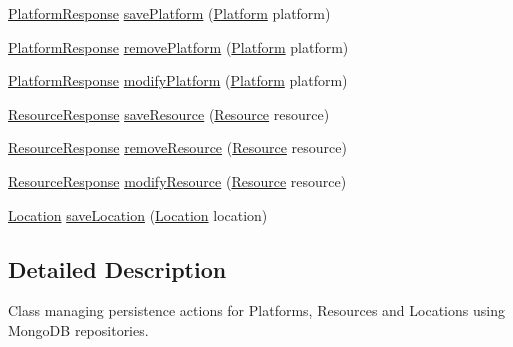 \begin{DoxyCompactItemize}
\item 
\hyperlink{classeu_1_1h2020_1_1symbiote_1_1model_1_1PlatformResponse}{Platform\+Response} \hyperlink{classeu_1_1h2020_1_1symbiote_1_1repository_1_1RepositoryManager_a4b0ab3911577e2b2577390e9c0566564}{save\+Platform} (\hyperlink{classeu_1_1h2020_1_1symbiote_1_1model_1_1Platform}{Platform} platform)
\item 
\hyperlink{classeu_1_1h2020_1_1symbiote_1_1model_1_1PlatformResponse}{Platform\+Response} \hyperlink{classeu_1_1h2020_1_1symbiote_1_1repository_1_1RepositoryManager_a3040700dcc9c91da9770fc2c5a96cdd1}{remove\+Platform} (\hyperlink{classeu_1_1h2020_1_1symbiote_1_1model_1_1Platform}{Platform} platform)
\item 
\hyperlink{classeu_1_1h2020_1_1symbiote_1_1model_1_1PlatformResponse}{Platform\+Response} \hyperlink{classeu_1_1h2020_1_1symbiote_1_1repository_1_1RepositoryManager_aeb1e54e87272c6a36188a75ee984d6f4}{modify\+Platform} (\hyperlink{classeu_1_1h2020_1_1symbiote_1_1model_1_1Platform}{Platform} platform)
\item 
\hyperlink{classeu_1_1h2020_1_1symbiote_1_1model_1_1ResourceResponse}{Resource\+Response} \hyperlink{classeu_1_1h2020_1_1symbiote_1_1repository_1_1RepositoryManager_a28f5700428aaffef548549bbccc6672b}{save\+Resource} (\hyperlink{classeu_1_1h2020_1_1symbiote_1_1model_1_1Resource}{Resource} resource)
\item 
\hyperlink{classeu_1_1h2020_1_1symbiote_1_1model_1_1ResourceResponse}{Resource\+Response} \hyperlink{classeu_1_1h2020_1_1symbiote_1_1repository_1_1RepositoryManager_ae2b1a848ec4bc02164d652a910550cc6}{remove\+Resource} (\hyperlink{classeu_1_1h2020_1_1symbiote_1_1model_1_1Resource}{Resource} resource)
\item 
\hyperlink{classeu_1_1h2020_1_1symbiote_1_1model_1_1ResourceResponse}{Resource\+Response} \hyperlink{classeu_1_1h2020_1_1symbiote_1_1repository_1_1RepositoryManager_aa501f5c6448048328ab71d7a9316f4a7}{modify\+Resource} (\hyperlink{classeu_1_1h2020_1_1symbiote_1_1model_1_1Resource}{Resource} resource)
\item 
\hyperlink{classeu_1_1h2020_1_1symbiote_1_1model_1_1Location}{Location} \hyperlink{classeu_1_1h2020_1_1symbiote_1_1repository_1_1RepositoryManager_ab019d153486c163e20cdaa7eaa39c4c0}{save\+Location} (\hyperlink{classeu_1_1h2020_1_1symbiote_1_1model_1_1Location}{Location} location)
\end{DoxyCompactItemize}


\subsection{Detailed Description}
Class managing persistence actions for Platforms, Resources and Locations using Mongo\+DB repositories.

